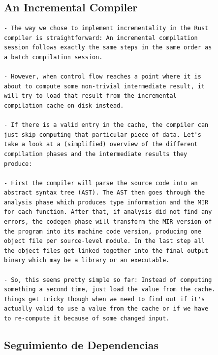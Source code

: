 \documentclass[12pt, a4paper]{report}
\begin{document}
\subsection*{An Incremental Compiler \cite{rust_blog_incremental_compilation}}

\begin{verbatim}
- The way we chose to implement incrementality in the Rust
compiler is straightforward: An incremental compilation
session follows exactly the same steps in the same order as
a batch compilation session.

- However, when control flow reaches a point where it is
about to compute some non-trivial intermediate result, it
will try to load that result from the incremental
compilation cache on disk instead.

- If there is a valid entry in the cache, the compiler can
just skip computing that particular piece of data. Let's
take a look at a (simplified) overview of the different
compilation phases and the intermediate results they
produce:

- First the compiler will parse the source code into an
abstract syntax tree (AST). The AST then goes through the
analysis phase which produces type information and the MIR
for each function. After that, if analysis did not find any
errors, the codegen phase will transform the MIR version of
the program into its machine code version, producing one
object file per source-level module. In the last step all
the object files get linked together into the final output
binary which may be a library or an executable.

- So, this seems pretty simple so far: Instead of computing
something a second time, just load the value from the cache.
Things get tricky though when we need to find out if it's
actually valid to use a value from the cache or if we have
to re-compute it because of some changed input.
\end{verbatim}
\cite{rust_blog_incremental_compilation}

\subsection*{Seguimiento de Dependencias \cite{olle_query_based}}
\end{document}
